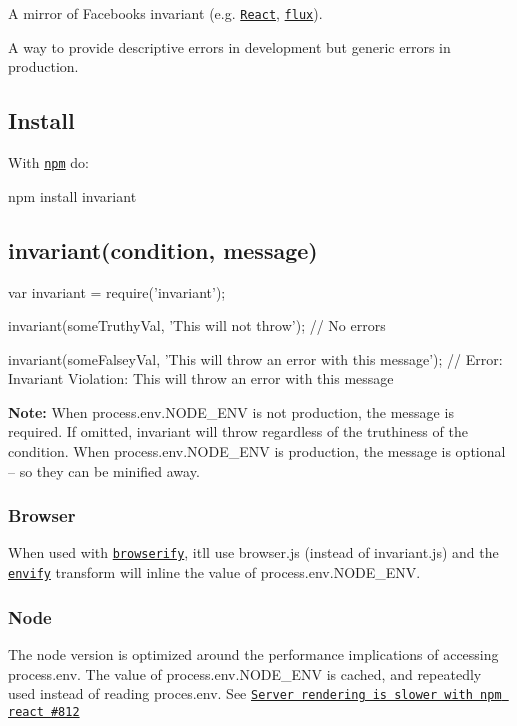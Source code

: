\href{https://travis-ci.org/zertosh/invariant}{\tt }

A mirror of Facebook\textquotesingle{}s {\ttfamily invariant} (e.\+g. \href{https://github.com/facebook/react/blob/v0.13.3/src/vendor/core/invariant.js}{\tt React}, \href{https://github.com/facebook/flux/blob/2.0.2/src/invariant.js}{\tt flux}).

A way to provide descriptive errors in development but generic errors in production.

\subsection*{Install}

With \href{http://npmjs.org}{\tt npm} do\+:


\begin{DoxyCode}
npm install invariant
\end{DoxyCode}


\subsection*{{\ttfamily invariant(condition, message)}}


\begin{DoxyCode}
var invariant = require('invariant');

invariant(someTruthyVal, 'This will not throw');
// No errors

invariant(someFalseyVal, 'This will throw an error with this message');
// Error: Invariant Violation: This will throw an error with this message
\end{DoxyCode}


{\bfseries Note\+:} When {\ttfamily process.\+env.\+N\+O\+D\+E\+\_\+\+E\+NV} is not {\ttfamily production}, the message is required. If omitted, {\ttfamily invariant} will throw regardless of the truthiness of the condition. When {\ttfamily process.\+env.\+N\+O\+D\+E\+\_\+\+E\+NV} is {\ttfamily production}, the message is optional – so they can be minified away.

\subsubsection*{Browser}

When used with \href{https://github.com/substack/node-browserify}{\tt browserify}, it\textquotesingle{}ll use {\ttfamily browser.\+js} (instead of {\ttfamily invariant.\+js}) and the \href{https://github.com/hughsk/envify}{\tt envify} transform will inline the value of {\ttfamily process.\+env.\+N\+O\+D\+E\+\_\+\+E\+NV}.

\subsubsection*{Node}

The node version is optimized around the performance implications of accessing {\ttfamily process.\+env}. The value of {\ttfamily process.\+env.\+N\+O\+D\+E\+\_\+\+E\+NV} is cached, and repeatedly used instead of reading {\ttfamily proces.\+env}. See \href{https://github.com/facebook/react/issues/812}{\tt Server rendering is slower with npm react \#812} 
